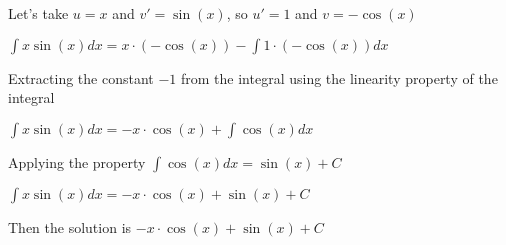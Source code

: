 Let's take $u = x$ and $v' = \sin{(x)}$, so $u' = 1$ and $v = -\cos{(x)}$

\singlespacing

$\int x\sin{(x) }dx = x\cdot (-\cos{(x)}) - \int 1\cdot (-\cos{(x)})dx$

\singlespacing

Extracting the constant $-1$ from the integral using the linearity property of the integral

\singlespacing

$\int x\sin{(x) }dx = -x\cdot \cos{(x)} + \int \cos{(x)}dx$

\singlespacing

Applying the property $\int \cos{(x)}dx = \sin{(x)} + C$

\singlespacing

$\int x\sin{(x) }dx = -x\cdot \cos{(x)} + \sin{(x)} + C$

\singlespacing

Then the solution is $-x\cdot \cos{(x)} + \sin{(x)} + C$
